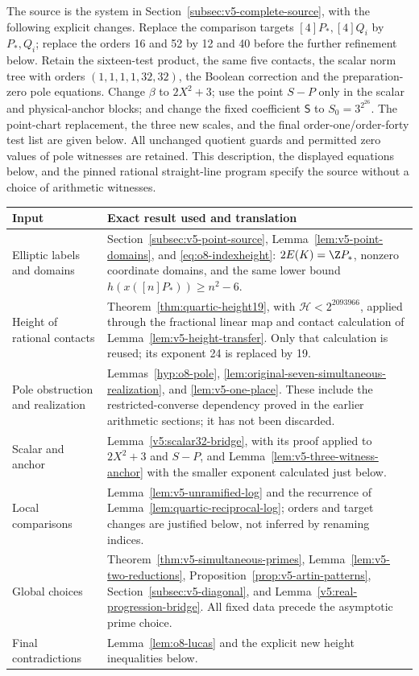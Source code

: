 The source is the system in Section~\ref{subsec:v5-complete-source},
with the following explicit changes. Replace the comparison targets
$[4]P_*,[4]Q_i$ by $P_*,Q_i$; replace the orders 16 and 52 by 12 and 40
before the further refinement below. Retain the sixteen-test product,
the same five contacts, the scalar norm tree with orders $(1,1,1,1,32,32)$,
the Boolean correction and the preparation-zero pole equations.
Change $\beta$ to $2X^2+3$; use the point $S-P$ only in the scalar and
physical-anchor blocks; and change the fixed coefficient $\mathsf S$
to $S_0=3^{2^{26}}$. The point-chart replacement, the three new scales,
and the final order-one/order-forty test list are given below. All
unchanged quotient guards and permitted zero values of pole witnesses
are retained. This description, the displayed equations below, and the
pinned rational straight-line program specify the source without a
choice of arithmetic witnesses.

\begin{center}\small
\begin{tabular}{p{}p{}}
\toprule
Input & Exact result used and translation\\\midrule
Elliptic labels and domains & Section~\ref{subsec:v5-point-source},
Lemma~\ref{lem:v5-point-domains}, and \eqref{eq:o8-indexheight}:
$2E(K)=\Z P_*$, nonzero coordinate domains, and the same lower bound
$h(x([n]P_*))\ge n^2-6$.\\
Height of rational contacts & Theorem~\ref{thm:quartic-height19},
with $\mathcal H<2^{2093966}$, applied through the fractional linear
map and contact calculation of Lemma~\ref{lem:v5-height-transfer}.
Only that calculation is reused; its exponent 24 is replaced by 19.\\
Pole obstruction and realization & Lemmas~\ref{hyp:o8-pole},
\ref{lem:original-seven-simultaneous-realization}, and
\ref{lem:v5-one-place}. These include the restricted-converse dependency
proved in the earlier arithmetic sections; it has not been discarded.\\
Scalar and anchor & Lemma~\ref{v5:scalar32-bridge}, with its proof
applied to $2X^2+3$ and $S-P$, and
Lemma~\ref{lem:v5-three-witness-anchor} with the smaller exponent
calculated just below.\\
Local comparisons & Lemma~\ref{lem:v5-unramified-log} and the
recurrence of Lemma~\ref{lem:quartic-reciprocal-log}; orders and
target changes are justified below, not inferred by renaming indices.\\
Global choices & Theorem~\ref{thm:v5-simultaneous-primes},
Lemma~\ref{lem:v5-two-reductions}, Proposition~\ref{prop:v5-artin-patterns},
Section~\ref{subsec:v5-diagonal}, and
Lemma~\ref{v5:real-progression-bridge}. All fixed data precede the
asymptotic prime choice.\\
Final contradictions & Lemma~\ref{lem:o8-lucas} and the explicit
new height inequalities below.\\\bottomrule
\end{tabular}
\end{center}

